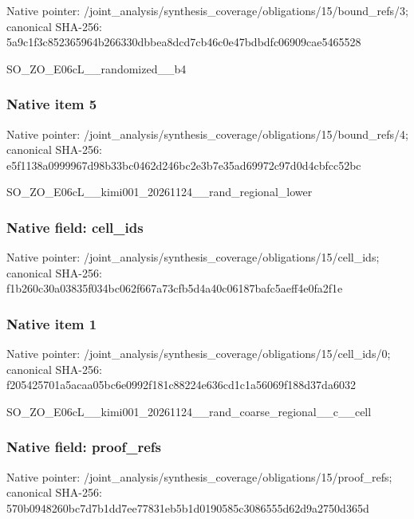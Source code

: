 \documentclass[10pt,a4paper]{article}
\begin{document}
Native pointer: /joint\_analysis/synthesi\allowbreak{}s\_coverage/obligations/1\allowbreak{}5/bound\_refs/3; canonical SHA-256: 5a9c1f3c852365964b266330\allowbreak{}dbbea8dcd7cb46c0e47bdbdf\allowbreak{}c06909cae5465528


SO\_ZO\_E06cL\_\_randomized\_\_b4


\subsubsection{Native item 5}


Native pointer: /joint\_analysis/synthesi\allowbreak{}s\_coverage/obligations/1\allowbreak{}5/bound\_refs/4; canonical SHA-256: e5f1138a0999967d98b33bc0\allowbreak{}462d246bc2e3b7e35ad69972\allowbreak{}c97d0d4cbfcc52bc


SO\_ZO\_E06cL\_\_kimi001\_202\allowbreak{}61124\_\_rand\_regional\_low\allowbreak{}er


\subsubsection{Native field: cell\_ids}


Native pointer: /joint\_analysis/synthesi\allowbreak{}s\_coverage/obligations/1\allowbreak{}5/cell\_ids; canonical SHA-256: f1b260c30a03835f034bc062\allowbreak{}f667a73cfb5d4a40c06187ba\allowbreak{}fc5aeff4e0fa2f1e



\subsubsection{Native item 1}


Native pointer: /joint\_analysis/synthesi\allowbreak{}s\_coverage/obligations/1\allowbreak{}5/cell\_ids/0; canonical SHA-256: f205425701a5acaa05bc6e09\allowbreak{}92f181c88224e636cd1c1a56\allowbreak{}069f188d37da6032


SO\_ZO\_E06cL\_\_kimi001\_202\allowbreak{}61124\_\_rand\_coarse\_regio\allowbreak{}nal\_\_c\_\_cell


\subsubsection{Native field: proof\_refs}


Native pointer: /joint\_analysis/synthesi\allowbreak{}s\_coverage/obligations/1\allowbreak{}5/proof\_refs; canonical SHA-256: 570b0948260bc7d7b1dd7ee7\allowbreak{}7831eb5b1d0190585c308655\allowbreak{}5d62d9a2750d365d
\end{document}
